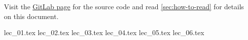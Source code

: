 \documentclass[10pt,english,a4paper, fancyfoot, git]{mkessler-script}
\author{Maximilian Keßler}
\begin{document}
\maketitle
\vfill
\doclicenseThis
Visit the
\href{https://gitlab.com/latexci/lecture-notes-bonn/topology-2}{GitLab page}
for the source code and read
\autoref{sec:how-to-read}
for details on this document.

\cleardoublepage
\tableofcontents

\cleardoublepage
\listoflecture

\cleardoublepage

    {lec_01.tex}
    {lec_02.tex}
    {lec_03.tex}
    {lec_04.tex}
    {lec_05.tex}
    {lec_06.tex}

\appendix

\cleardoublepage


\cleardoublepage


\cleardoublepage


\cleardoublepage


\printvocabindex
\end{document}

